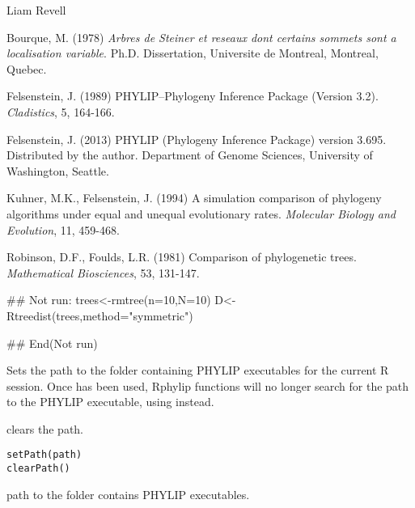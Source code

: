 \documentclass[a4paper]{book}
\begin{document}
%
\begin{Author}\relax
Liam Revell 
\end{Author}
%
\begin{References}\relax
Bourque, M. (1978) \emph{Arbres de Steiner et reseaux dont certains sommets sont a localisation variable}. Ph.D. Dissertation, Universite de Montreal, Montreal, Quebec.

Felsenstein, J. (1989) PHYLIP--Phylogeny Inference Package (Version 3.2). \emph{Cladistics}, 5, 164-166.

Felsenstein, J. (2013) PHYLIP (Phylogeny Inference Package) version 3.695. Distributed by the author. Department of Genome Sciences, University of Washington, Seattle.

Kuhner, M.K., Felsenstein, J. (1994) A simulation comparison of phylogeny algorithms under equal and unequal evolutionary rates. \emph{Molecular Biology and Evolution}, 11, 459-468.

Robinson, D.F., Foulds, L.R. (1981) Comparison of phylogenetic trees. \emph{Mathematical Biosciences}, 53, 131-147.
\end{References}
%
\begin{Examples}
\begin{ExampleCode}
## Not run: 
trees<-rmtree(n=10,N=10)
D<-Rtreedist(trees,method="symmetric")

## End(Not run)
\end{ExampleCode}
\end{Examples}
%
\begin{Description}\relax
Sets the path to the folder containing PHYLIP executables for the current R session. Once  has been used, Rphylip functions will no longer search for the path to the PHYLIP executable, using  instead.

 clears the path.
\end{Description}
%
\begin{Usage}
\begin{verbatim}
setPath(path)
clearPath()
\end{verbatim}
\end{Usage}
%
\begin{Arguments}
\begin{ldescription}
\item[\code{path}] path to the folder contains PHYLIP executables.
\end{ldescription}
\end{Arguments}
\end{document}
